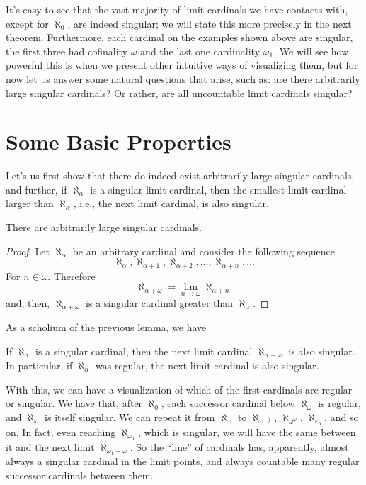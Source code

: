 It's easy to see that the vast majority of limit cardinals we have contacts with, except for $\aleph_0$, are indeed singular; we will state this more precisely in the next theorem. Furthermore, each cardinal on the examples shown above are singular, the first three had cofinality $\omega$ and the last one cardinality $\omega_1$. We will see how powerful this is when we present other intuitive ways of visualizing them, but for now let us answer some natural questions that arise, such as: are there arbitrarily large singular cardinals? Or rather, are all uncountable limit cardinals singular?

\section{Some Basic Properties}

Let's us first show that there do indeed exist arbitrarily large singular cardinals, and further, if $\aleph_\alpha$ is a singular limit cardinal, then the smallest limit cardinal larger than $\aleph_\alpha$, i.e., the next limit cardinal, is also singular.

\begin{lemma}{}{}
    There are arbitrarily large singular cardinals.
\end{lemma}
\begin{proof}
    Let $\aleph_\alpha$ be an arbitrary cardinal and consider the following sequence
    $$\aleph_\alpha,\aleph_{\alpha+1},\aleph_{\alpha+2},\dots,\aleph_{\alpha+n},\dots$$
    For $n\in\omega$. Therefore
    $$\aleph_{\alpha+\omega}=\lim_{n\to\omega}\aleph_{\alpha+n}$$
    and, then, $\aleph_{\alpha+\omega}$ is a singular cardinal greater than $\aleph_\alpha$.
\end{proof}

As a scholium of the previous lemma, we have

\begin{corollary}{}{}
    If $\aleph_\alpha$ is a singular cardinal, then the next limit cardinal $\aleph_{\alpha+\omega}$ is also singular. In particular, if $\aleph_{\alpha}$ was regular, the next limit cardinal is also singular.
\end{corollary}

With this, we can have a visualization of which of the first cardinals are regular or singular. We have that, after $\aleph_0$, each successor cardinal below $\aleph_\omega$ is regular, and $\aleph_\omega$ is itself singular. We can repeat it from $\aleph_\omega$ to $\aleph_{\omega\cdot 2}$, $\aleph_{\omega^\omega}$, $\aleph_{\varepsilon_0}$, and so on. In fact, even reaching $\aleph_{\omega_1}$, which is singular, we will have the same between it and the next limit $\aleph_{\omega_1+\omega}$. So the ``line'' of cardinals has, apparently, almost always a singular cardinal in the limit points, and always countable many regular successor cardinals between them.

